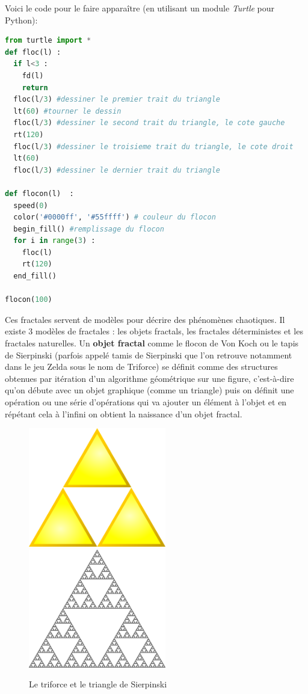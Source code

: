 \documentclass[french,11pt]{report}
\begin{document}
Voici le code pour le faire apparaître (en utilisant un module \textit{Turtle} pour Python):

\begin{lstlisting}[language = python]
from turtle import * 
def floc(l) :
  if l<3 :
    fd(l)
    return
  floc(l/3) #dessiner le premier trait du triangle
  lt(60) #tourner le dessin
  floc(l/3) #dessiner le second trait du triangle, le cote gauche
  rt(120)
  floc(l/3) #dessiner le troisieme trait du triangle, le cote droit
  lt(60)
  floc(l/3) #dessiner le dernier trait du triangle
 
def flocon(l)  :
  speed(0)
  color('#0000ff', '#55ffff') # couleur du flocon
  begin_fill() #remplissage du flocon
  for i in range(3) :
    floc(l)
    rt(120)
  end_fill()
 
flocon(100)
\end{lstlisting}

Ces fractales servent de modèles pour décrire des phénomènes chaotiques.
Il existe 3 modèles de fractales : les objets fractals, les fractales déterministes et les fractales naturelles. 
Un \textbf{objet fractal} comme le flocon de Von Koch ou le tapis de Sierpinski (parfois appelé tamis de Sierpinski que l’on retrouve notamment dans le jeu Zelda sous le nom de Triforce) se définit comme des structures obtenues par itération d’un algorithme géométrique sur une figure, c’est-à-dire qu’on débute avec un objet graphique (comme un triangle) puis on définit une opération ou une série d’opérations qui va ajouter un élément à l’objet et en répétant cela à l’infini on obtient la naissance d’un objet fractal. 

\begin{figure} [!h]
    \centering
    \includegraphics[width=6cm]{triforce}
    \label{fig:triforce}
    \includegraphics[width=6cm]{triangle_sierpinski}
    \label{fig:triangle_sierpinski}
    \caption{Le triforce et le triangle de Sierpinski}
\end{figure}
\end{document}
